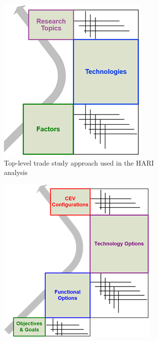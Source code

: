 \begin{figure}[tb!]
    \begin{center}
        \begin{subfigure}{0.49\textwidth}
            \includegraphics[width=\linewidth]{figures/TradeStudy/figure5a.png}
            \caption{Top-level trade study approach used in the HARI analysis}
        \end{subfigure}\hfill
        \begin{subfigure}{0.49\textwidth}
            \includegraphics[width=\linewidth]{figures/TradeStudy/figure5b.png}

\end{subfigure}
\end{center}
\end{figure}
